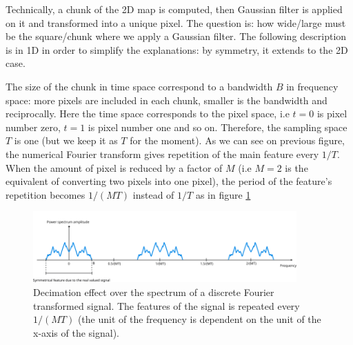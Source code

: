 \documentclass[11pt]{report}
\begin{document}
Technically, a chunk of the 2D map is computed, then Gaussian filter is applied on it and transformed into a unique pixel. The question is: how wide/large must be the square/chunk where we apply a Gaussian filter. The following description is in 1D in order to simplify the explanations: by symmetry, it extends to the 2D case.

The size of the chunk in time space correspond to a bandwidth $B$ in frequency space: more pixels are included in each chunk, smaller is the bandwidth and reciprocally. Here the time space corresponds to the pixel space, i.e $t=0$ is pixel number zero, $t=1$ is pixel number one and so on. Therefore, the sampling space $T$ is one (but we keep it as $T$ for the moment). As we can see on previous figure, the numerical Fourier transform gives repetition of the main feature every $1/T$. When the amount of pixel is reduced by a factor of $M$ (i.e $M=2$ is the equivalent of converting two pixels into one pixel), the period of the feature's repetition becomes $1/(MT)$ instead of $1/T$ as in figure \ref{fig:dwsmpl-freq}

\begin{figure}[h!]
\centering
\includegraphics[width=0.9\textwidth]{dwsmpl-freq}
\caption{Decimation effect over the spectrum of a discrete Fourier transformed signal. The features of the signal is repeated every $1/(MT)$ (the unit of the frequency is dependent on the unit of the x-axis of the signal).}
\label{fig:dwsmpl-freq}
\end{figure}
\end{document}
